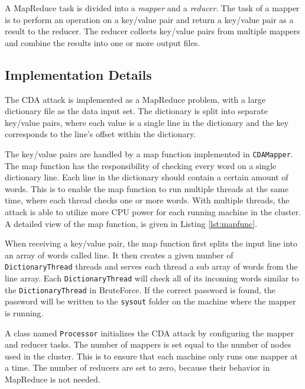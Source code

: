 \documentclass[pdftex,english,10pt,b5paper,twoside]{book}
\begin{document}
A MapReduce task is divided into a \emph{mapper} and a \emph{reducer}. The task
of a mapper is to perform an operation on a key/value pair and return a
key/value pair as a result to the reducer. The reducer collects key/value pairs
from multiple mappers and combine the results into one or more output files.

\subsection{Implementation Details} 

The \ac{CDA} attack is implemented as a MapReduce problem, with a large
dictionary file as the data input set. The dictionary is split into separate
key/value pairs, where each value is a single line in the dictionary and the
key corresponds to the line's offset within the dictionary.

The key/value pairs are handled by a map function implemented in
\texttt{CDAMapper}. The
map function has the responsibility of checking every word on a single
dictionary line. Each line in the dictionary should contain a certain amount of
words. This is to enable the map function to run multiple threads at the same
time, where each thread checks one or more words. With multiple threads, the
attack is able to utilize more \ac{CPU} power for each running machine in the
cluster. A detailed view of the map function, is given in Listing
\ref{lst:mapfunc}.



When receiving a key/value pair, the map function first splits the input line
into an array of words called line. It then creates a given number of
\texttt{DictionaryThread} threads and serves each thread a sub array of words from the
line array. Each \texttt{DictionaryThread} will check all of its incoming words similar
to the \texttt{DictionaryThread} in BruteForce. If the correct password is found, the
password will be written to the \texttt{sysout} folder on the machine where the mapper is
running.

A class named \texttt{Processor} initializes the \ac{CDA} attack by configuring
the mapper and reducer tasks. The number of mappers is set equal to the number
of nodes used in the cluster. This is to ensure that each machine only runs one
mapper at a time. The number of reducers are set to zero, because their
behavior in MapReduce is not needed.
\end{document}
